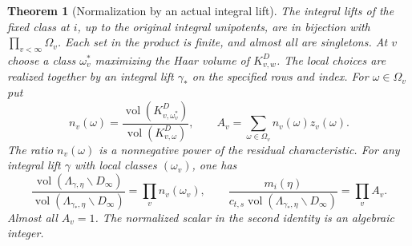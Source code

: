 \documentclass[a4paper,11pt]{article}
\newtheorem{theorem}[proposition]{Theorem}
\theoremstyle{definition}
\theoremstyle{remark}
\numberwithin{equation}{section}
\begin{document}
\begin{theorem}[Normalization by an actual integral lift]
\leavevmode\label{thm:localphase605}
The integral lifts of the fixed class at \(i\), up to the
original integral unipotents, are in bijection with
\(\prod_{v<\infty}\Omega_v\). Each set in the product is finite,
and almost all are singletons. At \(v\) choose a class \(\omega_v^*\)
maximizing the Haar volume of \(K^D_{v,w}\). The local choices
are realized together by an integral lift \(\gamma_*\) on the
specified rows and index. For \(\omega\in\Omega_v\) put
\[
       n_v(\omega)=
       \frac{\operatorname{vol}(K^D_{v,\omega_v^*})}
            {\operatorname{vol}(K^D_{v,\omega})},\qquad
       A_v=\sum_{\omega\in\Omega_v}n_v(\omega)z_v(\omega).
\]
The ratio \(n_v(\omega)\) is a nonnegative power of the
residual characteristic. For any integral lift \(\gamma\)
with local classes \((\omega_v)\), one has
\[
 \frac{\operatorname{vol}(\Lambda_{\gamma,\eta}\backslash D_\infty)}
      {\operatorname{vol}(\Lambda_{\gamma_*,\eta}\backslash D_\infty)}
       =\prod_v n_v(\omega_v),\qquad
 \frac{m_i(\eta)}
      {c_{t,s}\operatorname{vol}(\Lambda_{\gamma_*,\eta}\backslash D_\infty)}
       =\prod_v A_v .
\]
Almost all \(A_v=1\). The normalized scalar in the second
identity is an algebraic integer.
\end{theorem}
\end{document}

